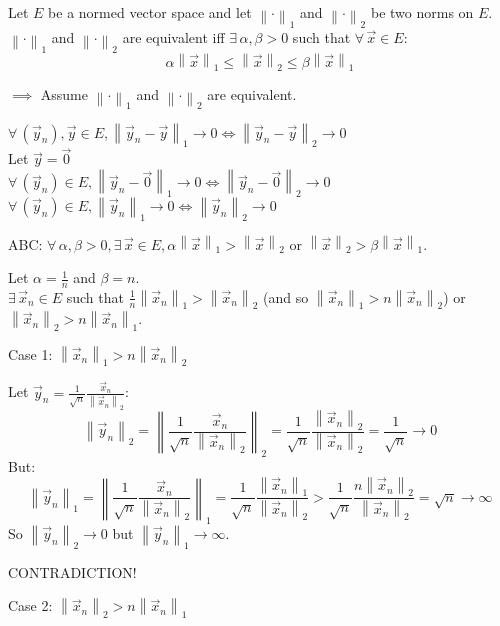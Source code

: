 \documentclass[letterpaper,12pt,fleqn]{article}
\newcommand{\nnorm}[2]{\left\|#1\right\|_{#2}}
\newcommand{\vx}{\vec{x}}
\newcommand{\vy}{\vec{y}}
\newcommand{\vo}{\vec{0}}
\renewcommand{\a}{\alpha}
\renewcommand{\b}{\beta}
\begin{document}
\begin{theorem}
  Let $E$ be a normed vector space and let $\nnorm{\cdot}{1}$ and
  $\nnorm{\cdot}{2}$ be two norms on $E$. $\nnorm{\cdot}{1}$ and
  $\nnorm{\cdot}{2}$ are equivalent iff $\exists\,\a,\b>0$ such that
  $\forall\,\vx\in E$:
  \[\a\nnorm{\vx}{1}\le\nnorm{\vx}{2}\le\b\nnorm{\vx}{1}\]
\end{theorem}

\begin{theproof}
  \listbreak
  \begin{description}
  \item $\implies$ Assume $\nnorm{\cdot}{1}$ and $\nnorm{\cdot}{2}$ are
    equivalent.

    $\forall\,(\vy_n),\vy\in E, \nnorm{\vy_n-\vy}{1}\to0\iff
    \nnorm{\vy_n-\vy}{2}\to0$ \\
    Let $\vy=\vo$ \\
    $\forall\,(\vy_n)\in E, \nnorm{\vy_n-\vo}{1}\to0\iff
    \nnorm{\vy_n-\vo}{2}\to0$ \\
    $\forall\,(\vy_n)\in E, \nnorm{\vy_n}{1}\to0\iff\nnorm{\vy_n}{2}\to0$

    ABC: $\forall\,\a,\b>0,\exists\,\vx\in E,
    \a\nnorm{\vx}{1}>\nnorm{\vx}{2}$ or $\nnorm{\vx}{2}>\b\nnorm{\vx}{1}$.

    Let $\a=\frac{1}{n}$ and $\b=n$. \\
    $\exists\,\vx_n\in E$ such that $\frac{1}{n}\nnorm{\vx_n}{1}>
    \nnorm{\vx_n}{2}$ (and so $\nnorm{\vx_n}{1}>n\nnorm{\vx_n}{2}$) or
    $\nnorm{\vx_n}{2}>n\nnorm{\vx_n}{1}$.

    \begin{description}
    \item Case 1: $\nnorm{\vx_n}{1}>n\nnorm{\vx_n}{2}$

      Let $\vy_n=\frac{1}{\sqrt{n}}\frac{\vx_n}{\nnorm{\vx_n}{2}}$:
      \[\nnorm{\vy_n}{2}=
      \nnorm{\frac{1}{\sqrt{n}}\frac{\vx_n}{\nnorm{\vx_n}{2}}}{2}=
      \frac{1}{\sqrt{n}}\frac{\nnorm{\vx_n}{2}}{\nnorm{\vx_n}{2}}=
      \frac{1}{\sqrt{n}}\to0\]
      But:
      \[\nnorm{\vy_n}{1}=
      \nnorm{\frac{1}{\sqrt{n}}\frac{\vx_n}{\nnorm{\vx_n}{2}}}{1}=
      \frac{1}{\sqrt{n}}\frac{\nnorm{\vx_n}{1}}{\nnorm{\vx_n}{2}}>
      \frac{1}{\sqrt{n}}\frac{n\nnorm{\vx_n}{2}}{\nnorm{\vx_n}{2}}=
      \sqrt{n}\to\infty\]
      So $\nnorm{\vy_n}{2}\to0$ but $\nnorm{\vy_n}{1}\to\infty$.
    
      CONTRADICTION!
      
    \item Case 2: $\nnorm{\vx_n}{2}>n\nnorm{\vx_n}{1}$


\end{description}
\end{description}
\end{theproof}
\end{document}
